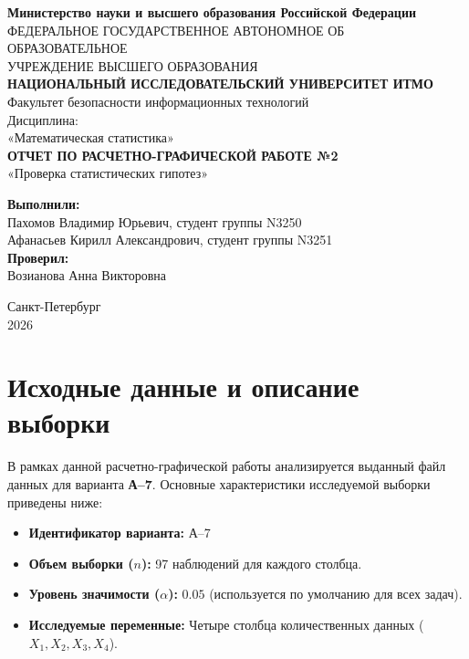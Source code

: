 \documentclass[12pt,a4paper]{article}
\begin{document}
\begin{titlepage}
    \centering
    \textbf{Министерство науки и высшего образования Российской Федерации}\\
    ФЕДЕРАЛЬНОЕ ГОСУДАРСТВЕННОЕ АВТОНОМНОЕ ОБ ОБРАЗОВАТЕЛЬНОЕ\\
    УЧРЕЖДЕНИЕ ВЫСШЕГО ОБРАЗОВАНИЯ\\
    \textbf{НАЦИОНАЛЬНЫЙ ИССЛЕДОВАТЕЛЬСКИЙ УНИВЕРСИТЕТ ИТМО}\\
    \vspace{1cm}
    Факультет безопасности информационных технологий\\
    \vspace{2cm}
    Дисциплина:\\
    «Математическая статистика»\\
    \vspace{2cm}
    \textbf{ОТЧЕТ ПО РАСЧЕТНО-ГРАФИЧЕСКОЙ РАБОТЕ №2}\\
    «Проверка статистических гипотез» \\
    \vspace{3cm}
    \begin{flushright}
        \textbf{Выполнили:}\\
        Пахомов Владимир Юрьевич, студент группы N3250\\
        Афанасьев Кирилл Александрович, студент группы N3251\\
        \vspace{0.5cm}
        \textbf{Проверил:}\\
        Возианова Анна Викторовна\\
    \end{flushright}
    \vfill
    Санкт-Петербург\\
    2026
\end{titlepage}

\newpage
\tableofcontents
\newpage

\section{Исходные данные и описание выборки}
В рамках данной расчетно-графической работы анализируется выданный файл данных для варианта \textbf{А--7}. 
Основные характеристики исследуемой выборки приведены ниже:
\begin{itemize}
    \item \textbf{Идентификатор варианта:} А--7
    \item \textbf{Объем выборки ($n$):} 97 наблюдений для каждого столбца.
    \item \textbf{Уровень значимости ($\alpha$):} $0.05$ (используется по умолчанию для всех задач).
    \item \textbf{Исследуемые переменные:} Четыре столбца количественных данных ($X_1, X_2, X_3, X_4$).
\end{itemize}
\end{document}
